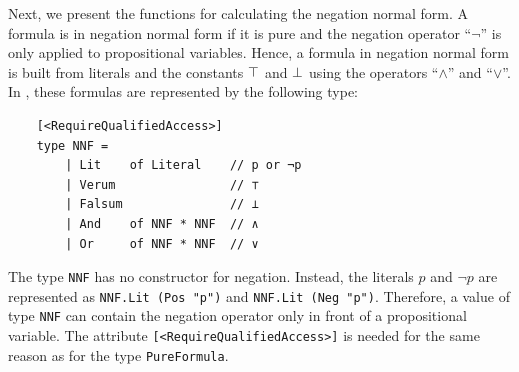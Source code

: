 Next, we present the functions for calculating the negation normal form.  A formula is in negation normal form
if it is pure and the negation operator ``$\neg$'' is only applied to propositional variables.  Hence, a
formula in negation normal form is built from literals and the constants $\top$ and $\bot$ using the
operators ``$\wedge$'' and ``$\vee$''.  In \Fsharp, these formulas are represented by the following type:

\begin{verbatim}
    [<RequireQualifiedAccess>]
    type NNF =
        | Lit    of Literal    // p or ¬p
        | Verum                // ⊤
        | Falsum               // ⊥
        | And    of NNF * NNF  // ∧
        | Or     of NNF * NNF  // ∨
\end{verbatim}

\noindent
The type \texttt{NNF} has no constructor for negation.  Instead, the literals $p$ and $\neg p$ are represented
as \texttt{NNF.Lit (Pos "p")} and \texttt{NNF.Lit (Neg "p")}.  Therefore, a value of type \texttt{NNF} can
contain the negation operator only in front of a propositional variable.  The attribute
\texttt{[<RequireQualifiedAccess>]} is needed for the same reason as for the type \texttt{PureFormula}.

